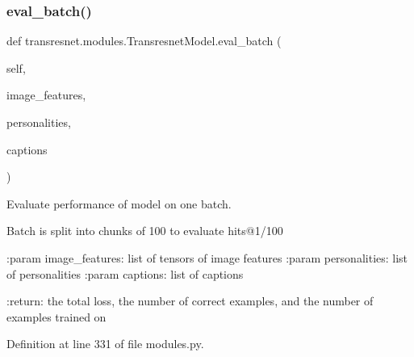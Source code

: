 \subsubsection{\texorpdfstring{eval\+\_\+batch()}{eval\_batch()}}
{\footnotesize\ttfamily def transresnet.\+modules.\+Transresnet\+Model.\+eval\+\_\+batch (\begin{DoxyParamCaption}\item[{}]{self,  }\item[{}]{image\+\_\+features,  }\item[{}]{personalities,  }\item[{}]{captions }\end{DoxyParamCaption})}

\begin{DoxyVerb}Evaluate performance of model on one batch.

Batch is split into chunks of 100 to evaluate hits@1/100

:param image_features:
    list of tensors of image features
:param personalities:
    list of personalities
:param captions:
    list of captions

:return:
    the total loss, the number of correct examples, and the number of
    examples trained on
\end{DoxyVerb}
 

Definition at line 331 of file modules.\+py.



